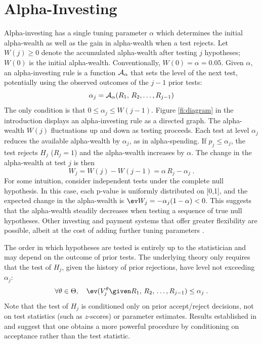 \documentclass[12pt]{article}
\begin{document}
\section{Alpha-Investing}     %

 Alpha-investing has a single tuning parameter $\alpha$ which determines the
 initial alpha-wealth as well as the gain in alpha-wealth when a test rejects.
  Let $W(j) \ge 0$ denote the accumulated alpha-wealth after testing $j$
 hypotheses; $W(0)$ is the initial alpha-wealth.  Conventionally, $W(0) = \alpha
 = 0.05$.  Given $\alpha$, an alpha-investing rule is a function ${\cal
 A}_{\alpha}$ that sets the level of the next test, potentially using the
 observed outcomes of the $j-1$ prior tests:
\begin{equation}
    \alpha_j = {\cal A}_\alpha(R_1,\, R_2, \ldots,R_{j-1}) 
\label{eq:investrule}
\end{equation}
 The only condition is that $0 \le \alpha_j \le W(j-1)$.  Figure
 \ref{fi:diagram} in the introduction displays an alpha-investing rule as a
 directed graph.  The alpha-wealth $W(j)$ fluctuations up and down as testing
 proceeds.  Each test at level $\alpha_j$ reduces the available alpha-wealth by
 $\alpha_j$, as in alpha-spending.  If $p_j \le \alpha_j$, the test rejects
 $H_j$ ($R_j=1$) and the alpha-wealth increases by $\alpha$.  The change in the
 alpha-wealth at test $j$ is then
\begin{equation}
  W_j = W(j) - W(j-1) = \alpha \, R_j - \alpha_j \;.
\label{eq:Wj}
\end{equation}
 For some intuition, consider independent tests under the complete null
 hypothesis.  In this case, each p-value is uniformly distributed on [0,1], and
 the expected change in the alpha-wealth is $ \ev W_j = -\alpha_j (1-\alpha) <
 0$.  This suggests that the alpha-wealth steadily decreases when testing a
 sequence of true null hypotheses.  Other investing and payment systems that
 offer greater flexibility are possible, albeit at the cost of adding further
 tuning parameters \citep{fosterstine08}.

 
 The order in which hypotheses are tested is entirely up to the statistician and
 may depend on the outcome of prior tests.  The underlying theory only requires
 that the test of $H_j$, given the history of prior rejections, have level not
 exceeding $\alpha_j$:
\begin{equation}
  \forall \theta \in \Theta, \quad
  \ev(V^\theta_j \given R_{1},\,R_{2},\, \ldots, R_{j-1})
  \le \alpha_j   \;.
\label{eq:alpham}
\end{equation}
 Note that the test of $H_j$ is conditioned only on prior accept/reject
 decisions, not on test statistics (such as $z$-scores) or parameter estimates.
  Results established in \citet{lehmacher99} and \citet{tsiatis03} suggest that
 one obtains a more powerful procedure by conditioning on acceptance rather than
 the test statistic.
\end{document}
